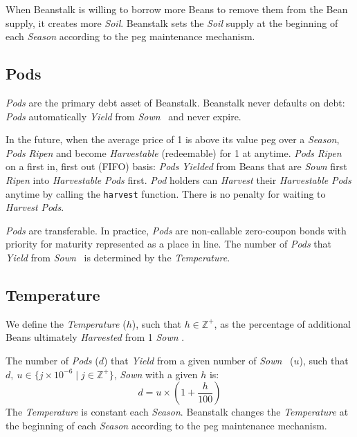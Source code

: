\documentclass[tikz]{article}
\newcommand{\code}[1]{\texttt{#1}}
\newcommand{\term}[1]{\textsl{#1}}
\newcommand{\Bean}{} %
\begin{document}
When Beanstalk is willing to borrow more Beans to remove them from the Bean supply, it creates more \term{Soil}. Beanstalk sets the \term{Soil} supply at the beginning of each \term{Season} according to the peg maintenance mechanism.

\subsection{Pods}
\term{Pods} are the primary debt asset of Beanstalk. Beanstalk never defaults on debt: \term{Pods} automatically \term{Yield} from \term{Sown} \Bean\ and never expire.

In the future, when the average price of \Bean1 is above its value peg over a \term{Season}, \term{Pods} \term{Ripen} and become \term{Harvestable} (redeemable) for \Bean1 at anytime. \term{Pods} \term{Ripen} on a first in, first out (FIFO) basis: \term{Pods} \term{Yielded} from Beans that are \term{Sown} first \term{Ripen} into \term{Harvestable} \term{Pods} first. \term{Pod} holders can \term{Harvest} their \term{Harvestable} \term{Pods} anytime by calling the \code{harvest} function. There is no penalty for waiting to \term{Harvest} \term{Pods}.

\term{Pods} are transferable. In practice, \term{Pods} are non-callable zero-coupon bonds with priority for maturity represented as a place in line. The number of \term{Pods} that \term{Yield} from \term{Sown} \Bean\ is determined by the \term{Temperature}.

\subsection{Temperature}
We define the \term{Temperature} ($h$), such that $h \in \mathbb{Z}^{+}$, as the percentage of additional Beans ultimately \term{Harvested} from 1 \term{Sown} \Bean. 

The number of \term{Pods} ($d$) that \term{Yield} from a given number of \term{Sown} \Bean\ ($u$), such that $d,\ u \in \{j \times 10^{-6} \mid j \in \mathbb{Z}^{+} \}$, \term{Sown} with a given $h$ is:
$$d = u \times \left(1 + \frac{h}{100}\right)$$
The \term{Temperature} is constant each \term{Season}. Beanstalk changes the \term{Temperature} at the beginning of each \term{Season} according to the peg maintenance mechanism.
\end{document}
